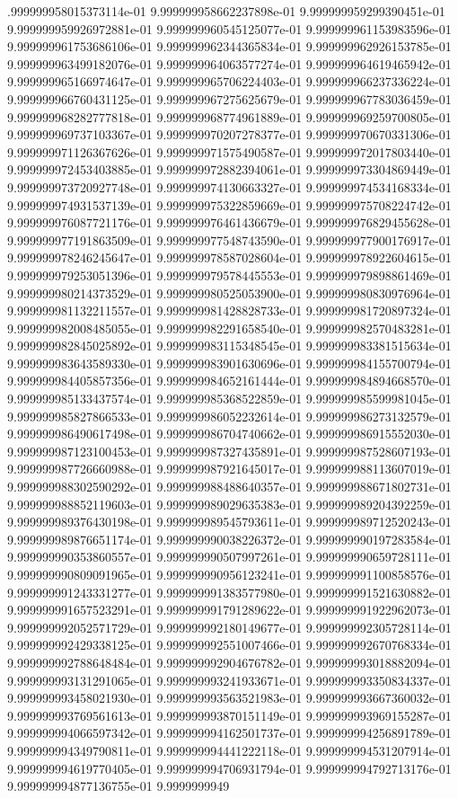 .999999958015373114e-01	9.999999958662237898e-01	9.999999959299390451e-01	9.999999959926972881e-01	9.999999960545125077e-01	9.999999961153983596e-01	9.999999961753686106e-01	9.999999962344365834e-01	9.999999962926153785e-01	9.999999963499182076e-01	9.999999964063577274e-01	9.999999964619465942e-01	9.999999965166974647e-01	9.999999965706224403e-01	9.999999966237336224e-01	9.999999966760431125e-01	9.999999967275625679e-01	9.999999967783036459e-01	9.999999968282777818e-01	9.999999968774961889e-01	9.999999969259700805e-01	9.999999969737103367e-01	9.999999970207278377e-01	9.999999970670331306e-01	9.999999971126367626e-01	9.999999971575490587e-01	9.999999972017803440e-01	9.999999972453403885e-01	9.999999972882394061e-01	9.999999973304869449e-01	9.999999973720927748e-01	9.999999974130663327e-01	9.999999974534168334e-01	9.999999974931537139e-01	9.999999975322859669e-01	9.999999975708224742e-01	9.999999976087721176e-01	9.999999976461436679e-01	9.999999976829455628e-01	9.999999977191863509e-01	9.999999977548743590e-01	9.999999977900176917e-01	9.999999978246245647e-01	9.999999978587028604e-01	9.999999978922604615e-01	9.999999979253051396e-01	9.999999979578445553e-01	9.999999979898861469e-01	9.999999980214373529e-01	9.999999980525053900e-01	9.999999980830976964e-01	9.999999981132211557e-01	9.999999981428828733e-01	9.999999981720897324e-01	9.999999982008485055e-01	9.999999982291658540e-01	9.999999982570483281e-01	9.999999982845025892e-01	9.999999983115348545e-01	9.999999983381515634e-01	9.999999983643589330e-01	9.999999983901630696e-01	9.999999984155700794e-01	9.999999984405857356e-01	9.999999984652161444e-01	9.999999984894668570e-01	9.999999985133437574e-01	9.999999985368522859e-01	9.999999985599981045e-01	9.999999985827866533e-01	9.999999986052232614e-01	9.999999986273132579e-01	9.999999986490617498e-01	9.999999986704740662e-01	9.999999986915552030e-01	9.999999987123100453e-01	9.999999987327435891e-01	9.999999987528607193e-01	9.999999987726660988e-01	9.999999987921645017e-01	9.999999988113607019e-01	9.999999988302590292e-01	9.999999988488640357e-01	9.999999988671802731e-01	9.999999988852119603e-01	9.999999989029635383e-01	9.999999989204392259e-01	9.999999989376430198e-01	9.999999989545793611e-01	9.999999989712520243e-01	9.999999989876651174e-01	9.999999990038226372e-01	9.999999990197283584e-01	9.999999990353860557e-01	9.999999990507997261e-01	9.999999990659728111e-01	9.999999990809091965e-01	9.999999990956123241e-01	9.999999991100858576e-01	9.999999991243331277e-01	9.999999991383577980e-01	9.999999991521630882e-01	9.999999991657523291e-01	9.999999991791289622e-01	9.999999991922962073e-01	9.999999992052571729e-01	9.999999992180149677e-01	9.999999992305728114e-01	9.999999992429338125e-01	9.999999992551007466e-01	9.999999992670768334e-01	9.999999992788648484e-01	9.999999992904676782e-01	9.999999993018882094e-01	9.999999993131291065e-01	9.999999993241933671e-01	9.999999993350834337e-01	9.999999993458021930e-01	9.999999993563521983e-01	9.999999993667360032e-01	9.999999993769561613e-01	9.999999993870151149e-01	9.999999993969155287e-01	9.999999994066597342e-01	9.999999994162501737e-01	9.999999994256891789e-01	9.999999994349790811e-01	9.999999994441222118e-01	9.999999994531207914e-01	9.999999994619770405e-01	9.999999994706931794e-01	9.999999994792713176e-01	9.999999994877136755e-01	9.9999999949